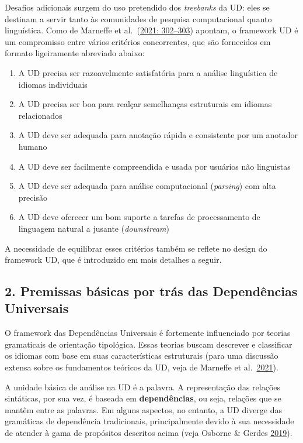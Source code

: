 \documentclass[
  brazilian,
]{article}
\providecommand{\tightlist}{%
  \setlength{\itemsep}{0pt}\setlength{\parskip}{0pt}}
\begin{document}
Desafios adicionais surgem do uso pretendido dos \emph{treebanks} da UD:
eles se destinam a servir tanto às comunidades de pesquisa computacional
quanto linguística. Como de Marneffe et
al.~(\href{https://doi.org/10.1162/coli_a_00402}{2021: 302--303})
apontam, o framework UD é um compromisso entre vários critérios
concorrentes, que são fornecidos em formato ligeiramente abreviado
abaixo:

\begin{enumerate}
\def\labelenumi{\arabic{enumi}.}
\tightlist
\item
  A UD precisa ser razoavelmente satisfatória para a análise linguística
  de idiomas individuais
\item
  A UD precisa ser boa para realçar semelhanças estruturais em idiomas
  relacionados
\item
  A UD deve ser adequada para anotação rápida e consistente por um
  anotador humano
\item
  A UD deve ser facilmente compreendida e usada por usuários não
  linguistas
\item
  A UD deve ser adequada para análise computacional (\emph{parsing}) com
  alta precisão
\item
  A UD deve oferecer um bom suporte a tarefas de processamento de
  linguagem natural a jusante (\emph{downstream})
\end{enumerate}

A necessidade de equilibrar esses critérios também se reflete no design
do framework UD, que é introduzido em mais detalhes a seguir.

\hypertarget{premissas-buxe1sicas-por-truxe1s-das-dependuxeancias-universais}{%
\subsection{2. Premissas básicas por trás das Dependências
Universais}\label{premissas-buxe1sicas-por-truxe1s-das-dependuxeancias-universais}}

O framework das Dependências Universais é fortemente influenciado por
teorias gramaticais de orientação tipológica. Essas teorias buscam
descrever e classificar os idiomas com base em suas características
estruturais (para uma discussão extensa sobre os fundamentos teóricos da
UD, veja de Marneffe et
al.~\href{https://doi.org/10.1162/coli_a_00402}{2021}).

A unidade básica de análise na UD é a palavra. A representação das
relações sintáticas, por sua vez, é baseada em \textbf{dependências}, ou
seja, relações que se mantêm entre as palavras. Em alguns aspectos, no
entanto, a UD diverge das gramáticas de dependência tradicionais,
principalmente devido à sua necessidade de atender à gama de propósitos
descritos acima (veja Osborne \& Gerdes
\href{https://doi.org/10.5334/gjgl.537}{2019}).
\end{document}
